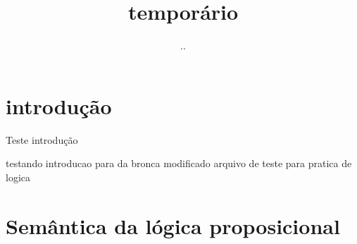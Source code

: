 \documentclass{article}
\title{temporário}
\author{..}
\begin{document}
\maketitle

\section{introdução}


Teste introdução

testando introducao para da bronca
modificado
arquivo de teste para pratica de logica
\section{Semântica da lógica proposicional}
\end{document}
